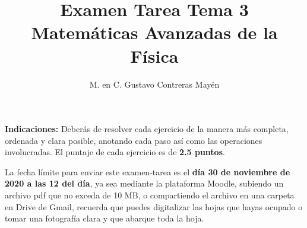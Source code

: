 
\geometry{top=1.25cm, bottom=1.5cm, left=1.25cm, right=0.8cm}
\title{Examen Tarea Tema 3 \\ \large {Matemáticas Avanzadas de la Física}  \vspace{-3ex}}
\author{M. en C. Gustavo Contreras Mayén}
\date{ }

\vspace{-4cm}
\maketitle
\fontsize{14}{14}\selectfont
\textbf{Indicaciones: } Deberás de resolver cada ejercicio de la manera más completa, ordenada y clara posible, anotando cada paso así como las operaciones involucradas. El puntaje de cada ejercicio es de \textbf{2.5 puntos}.
\par
La fecha límite para enviar este examen-tarea es el \textbf{día 30 de noviembre de 2020 a las 12 del día}, ya sea mediante la plataforma Moodle, subiendo un archivo pdf que no exceda de 10 MB, o compartiendo el archivo en una carpeta en Drive de Gmail, recuerda que puedes digitalizar las hojas que hayas ocupado o tomar una fotografía clara y que abarque toda la hoja.

